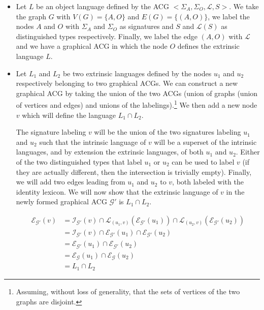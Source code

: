 \begin{itemize}
\item Let $L$ be an object language defined by the ACG $\mathopen{<}
  \Sigma_A, \Sigma_O, \mathcal{L}, S\mathclose{>}$. We take the graph
  $G$ with $V(G) = \{A, O\}$ and $E(G) = \{(A,O)\}$, we label the nodes
  $A$ and $O$ with $\Sigma_A$ and $\Sigma_O$ as signatures and $S$ and
  $\mathcal{L}(S)$ as distinguished types respectively. Finally, we
  label the edge $(A,O)$ with $\mathcal{L}$ and we have a graphical ACG
  in which the node $O$ defines the extrinsic language $L$.

\item Let $L_1$ and $L_2$ be two extrinsic languages defined by the
  nodes $u_1$ and $u_2$ respectively belonging to two graphical ACGs. We
  can construct a new graphical ACG by taking the union of the two ACGs
  (union of graphs (union of vertices and edges) and unions of the
  labelings).\footnote{Assuming, without loss of generality, that the
    sets of vertices of the two graphs are disjoint.} We then add a new
  node $v$ which will define the language $L_1 \cap L_2$.

  The signature labeling $v$ will be the union of the two signatures
  labeling $u_1$ and $u_2$ such that the intrinsic language of $v$ will
  be a superset of the intrinsic languages, and by extension the
  extrinsic languages, of both $u_1$ and $u_2$. Either of the two
  distinguished types that label $u_1$ or $u_2$ can be used to label $v$
  (if they are actually different, then the intersection is trivially
  empty). Finally, we will add two edges leading from $u_1$ and $u_2$ to
  $v$, both labeled with the identity lexicon. We will now show that
  the extrinsic language of $v$ in the newly formed graphical ACG
  $\mathcal{G}'$ is $L_1 \cap L_2$.

  \begin{align*}
    \mathcal{E}_{\mathcal{G}'}(v) &= \mathcal{I}_{\mathcal{G}'}(v) \cap
    \mathcal{L}_{(u_1,v)}(\mathcal{E}_{\mathcal{G}'}(u_1)) \cap
    \mathcal{L}_{(u_2,v)}(\mathcal{E}_{\mathcal{G}'}(u_2)) \\ &=
    \mathcal{I}_{\mathcal{G}'}(v) \cap \mathcal{E}_{\mathcal{G}'}(u_1) \cap
    \mathcal{E}_{\mathcal{G}'}(u_2) \\ &= \mathcal{E}_{\mathcal{G}'}(u_1)
    \cap \mathcal{E}_{\mathcal{G}'}(u_2) \\ &=
    \mathcal{E}_{\mathcal{G}}(u_1) \cap \mathcal{E}_{\mathcal{G}}(u_2) \\ &=
    L_1 \cap L_2
  \end{align*}


\end{itemize}
